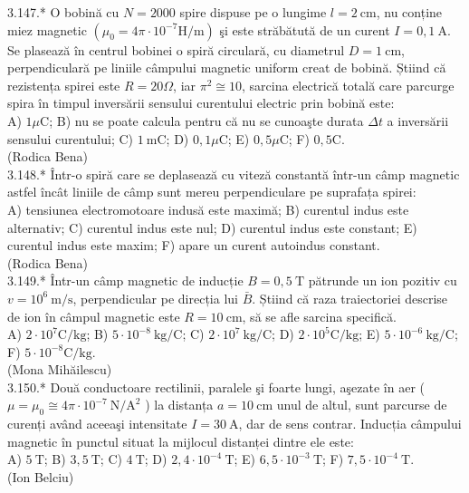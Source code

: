 \documentclass[10pt]{article}
\begin{document}
3.147.* O bobină cu $N=2000$ spire dispuse pe o lungime $l=2 \mathrm{~cm}$, nu conține miez magnetic $\left(\mu_{0}=4 \pi \cdot 10^{-7} \mathrm{H} / \mathrm{m}\right)$ şi este străbătută de un curent $I=0,1 \mathrm{~A}$. Se plasează în centrul bobinei o spiră circulară, cu diametrul $D=1 \mathrm{~cm}$, perpendiculară pe liniile câmpului magnetic uniform creat de bobină. Știind că rezistența spirei este $R=20 \Omega$, iar $\pi^{2} \cong 10$, sarcina electrică totală care parcurge spira în timpul inversării sensului curentului electric prin bobină este:\\ A) $1 \mu \mathrm{C}$; B) nu se poate calcula pentru că nu se cunoaşte durata $\Delta t$ a inversării sensului curentului; C) $1 \mathrm{~mC}$; D) $0,1 \mu \mathrm{C}$; E) $0,5 \mu \mathrm{C}$; F) $0,5 \mathrm{C}$.\\ (Rodica Bena)\\

3.148.* Într-o spiră care se deplasează cu viteză constantă într-un câmp magnetic astfel încât liniile de câmp sunt mereu perpendiculare pe suprafața spirei:\\ A) tensiunea electromotoare indusă este maximă; B) curentul indus este alternativ; C) curentul indus este nul; D) curentul indus este constant; E) curentul indus este maxim; F) apare un curent autoindus constant.\\ (Rodica Bena)\\

3.149.* Într-un câmp magnetic de inducție $B=0,5 \mathrm{~T}$ pătrunde un ion pozitiv cu $v=10^{6} \mathrm{~m} / \mathrm{s}$, perpendicular pe direcția lui $\bar{B}$. Știind că raza traiectoriei descrise de ion în câmpul magnetic este $R=10 \mathrm{~cm}$, să se afle sarcina specifică.\\ A) $2 \cdot 10^{7} \mathrm{C} / \mathrm{kg}$; B) $5 \cdot 10^{-8} \mathrm{~kg} / \mathrm{C}$; C) $2 \cdot 10^{7} \mathrm{~kg} / \mathrm{C}$; D) $2 \cdot 10^{5} \mathrm{C} / \mathrm{kg}$; E) $5 \cdot 10^{-6} \mathrm{~kg} / \mathrm{C}$; F) $5 \cdot 10^{-8} \mathrm{C} / \mathrm{kg}$.\\ (Mona Mihăilescu)\\

3.150.* Două conductoare rectilinii, paralele şi foarte lungi, aşezate în aer ( $\mu=\mu_{0} \cong 4 \pi \cdot 10^{-7} \mathrm{~N} / \mathrm{A}^{2}$ ) la distanța $a=10 \mathrm{~cm}$ unul de altul, sunt parcurse de curenți având aceeaşi intensitate $I=30 \mathrm{~A}$, dar de sens contrar. Inducția câmpului magnetic în punctul situat la mijlocul distanței dintre ele este:\\ A) $5 \mathrm{~T}$; B) $3,5 \mathrm{~T}$; C) $4 \mathrm{~T}$; D) $2,4 \cdot 10^{-4} \mathrm{~T}$; E) $6,5 \cdot 10^{-3} \mathrm{~T}$; F) $7,5 \cdot 10^{-4} \mathrm{~T}$.\\ (Ion Belciu)\\
\end{document}
